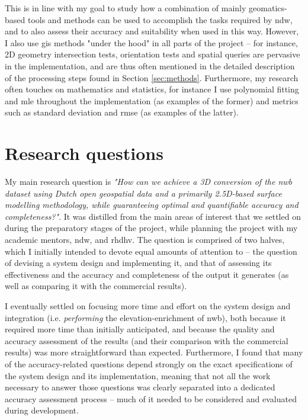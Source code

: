 This is in line with my goal to study how a combination of mainly geomatics-based tools and methods can be used to accomplish the tasks required by \ac{ndw}, and to also assess their accuracy and suitability when used in this way. However, I also use \ac{gis} methods "under the hood" in all parts of the project – for instance, 2D geometry intersection tests, orientation tests and spatial queries are pervasive in the implementation, and are thus often mentioned in the detailed description of the processing steps found in Section \ref{sec:methods}. Furthermore, my research often touches on mathematics and statistics, for instance I use polynomial fitting and \ac{mle} throughout the implementation (as examples of the former) and metrics such as standard deviation and \ac{rmse} (as examples of the latter).

\section{Research questions}
\label{sec:rq}

My main research question is \textit{"How can we achieve a 3D conversion of the \ac{nwb} dataset using Dutch open geospatial data and a primarily 2.5D-based surface modelling methodology, while guaranteeing optimal and quantifiable accuracy and completeness?"}. It was distilled from the main areas of interest that we settled on during the preparatory stages of the project, while planning the project with my academic mentors, \ac{ndw}, and \ac{rhdhv}. The question is comprised of two halves, which I initially intended to devote equal amounts of attention to – the question of devising a system design and implementing it, and that of assessing its effectiveness and the accuracy and completeness of the output it generates (as well as comparing it with the commercial results).

I eventually settled on focusing more time and effort on the system design and integration (i.e. \textit{performing} the elevation-enrichment of \ac{nwb}), both because it required more time than initially anticipated, and because the quality and accuracy assessment of the results (and their comparison with the commercial results) was more straightforward than expected. Furthermore, I found that many of the accuracy-related questions depend strongly on the exact specifications of the system design and its implementation, meaning that not all the work necessary to answer those questions was clearly separated into a dedicated accuracy assessment process – much of it needed to be considered and evaluated during development.

